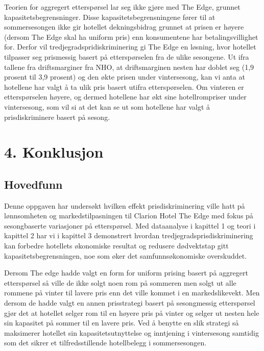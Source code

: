 \documentclass[
  12pt,
  a4paper,
  DIV=11,
  numbers=noendperiod]{scrartcl}
\begin{document}
Teorien for aggregert etterspørsel lar seg ikke gjøre med The Edge,
grunnet kapasitetsbegrensninger. Disse kapasitetsbegrensningene fører
til at sommersesongen ikke gir hotellet dekningsbidrag grunnet at prisen
er høyere (dersom The Edge skal ha uniform pris) enn konsumentene har
betalingsvillighet for. Derfor vil tredjegradspridiskriminering gi The
Edge en løsning, hvor hotellet tilpasser seg prismessig basert på
etterspørselen fra de ulike sesongene. Ut ifra tallene fra
driftsmarginer fra NHO, at driftsmarginen nesten har doblet seg (1,9
prosent til 3,9 prosent) og den økte prisen under vintersesong, kan vi
anta at hotellene har valgt å ta ulik pris basert utifra etterspørselen.
Om vinteren er etterspørselen høyere, og dermed hotellene har økt sine
hotellrompriser under vintersesong, som vil si at det kan se ut som
hotellene har valgt å prisdiskriminere basert på sesong.

\clearpage

\section{4. Konklusjon}\label{konklusjon}

\subsection{Hovedfunn}\label{hovedfunn}

Denne oppgaven har undersøkt hvilken effekt prisdiskriminering ville
hatt på lønnsomheten og markedstilpasningen til Clarion Hotel The Edge
med fokus på sesongbaserte variasjoner på etterspørsel. Med dataanalyse
i kapittel 1 og teori i kapittel 2 har vi i kapittel 3 demonstrert
hvordan tredjegradsprisdiskriminering kan forbedre hotellets økonomiske
resultat og redusere dødvektstap gitt kapasitetsbegrensningen, noe som
øker det samfunnsøkonomiske overskuddet.

Dersom The edge hadde valgt en form for uniform prising basert på
aggregert etterspørsel så ville de ikke solgt noen rom på sommeren men
solgt ut alle rommene på vinter til lavere pris enn det ville kommet i
en markedslikevekt. Men dersom de hadde valgt en annen prisstrategi
basert på sesongmessig etterspørsel gjør det at hotellet selger rom til
en høyere pris på vinter og selger ut nesten hele sin kapasitet på
sommer til en lavere pris. Ved å benytte en slik strategi så maksimerer
hotellet sin kapasitetsutnyttelse og inntjening i vintersesong samtidig
som det sikrer et tilfredsstillende hotellbelegg i sommersesongen.
\end{document}
